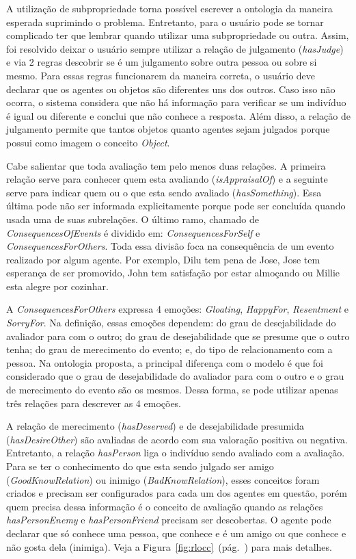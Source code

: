 A utilização de subpropriedade torna possível escrever a ontologia da maneira
esperada suprimindo o problema. Entretanto, para o usuário pode se tornar
complicado ter que lembrar quando utilizar uma subpropriedade ou outra.
Assim, foi resolvido deixar o usuário sempre utilizar a relação de julgamento
(\emph{hasJudge}) e via 2 regras descobrir se é um julgamento sobre outra
pessoa ou sobre si mesmo. Para essas regras funcionarem da maneira correta,
o usuário deve declarar que os agentes ou objetos são diferentes uns dos
outros. Caso isso não ocorra, o sistema considera que não há informação para
verificar se um indivíduo é igual ou diferente e conclui que não conhece a
resposta. Além disso, a relação de julgamento permite que tantos objetos
quanto agentes sejam julgados porque possui como imagem o conceito
\emph{Object}.

Cabe salientar que toda avaliação tem pelo menos duas relações. A primeira
relação serve para conhecer quem esta avaliando (\emph{isAppraisalOf}) e a
seguinte serve para indicar quem ou o que esta sendo avaliado
(\emph{hasSomething}). Essa última pode não ser informada explicitamente porque pode
ser concluída quando usada uma de suas subrelações. O último ramo, chamado de
\emph{ConsequencesOfEvents} é dividido em: \emph{ConsequencesForSelf} e
\emph{ConsequencesForOthers}. Toda essa divisão foca na consequência de um
evento realizado por algum agente. Por exemplo, Dilu tem pena
de Jose, Jose tem esperança de ser promovido, John tem satisfação por
estar almoçando ou Millie esta alegre por cozinhar.

A \emph{ConsequencesForOthers} expressa 4 emoções: \emph{Gloating},
\emph{HappyFor}, \emph{Resentment} e \emph{SorryFor}. Na definição, essas
emoções dependem: do grau de desejabilidade do avaliador para com o outro; do
grau de desejabilidade que se presume que o outro tenha; do grau de
merecimento do evento; e, do tipo de relacionamento com a pessoa. Na ontologia
proposta, a principal diferença com o modelo \occ é que foi considerado
que o grau de desejabilidade do avaliador para com o outro e o grau de
merecimento do evento são os mesmos. Dessa forma, se pode utilizar apenas três
relações para descrever as 4 emoções.

A relação de merecimento (\emph{hasDeserved}) e de desejabilidade
presumida (\emph{hasDesireOther}) são avaliadas de acordo com sua valoração
positiva ou negativa. Entretanto, a relação \emph{hasPerson} liga o indivíduo
sendo avaliado com a avaliação. Para se ter o conhecimento do que esta sendo julgado
ser amigo (\emph{GoodKnowRelation}) ou inimigo (\emph{BadKnowRelation}), esses
conceitos foram criados e precisam ser configurados para cada um dos agentes
em questão, porém quem precisa dessa informação é o conceito de avaliação
quando as relações \emph{hasPersonEnemy} e \emph{hasPersonFriend} precisam ser
descobertas. O agente pode declarar que só conhece uma pessoa, que conhece e é
um amigo ou que conhece e não gosta dela (inimiga). Veja a
Figura~\ref{fig:rlocc}~(pág.~\pageref{fig:rlocc}) para mais detalhes.

